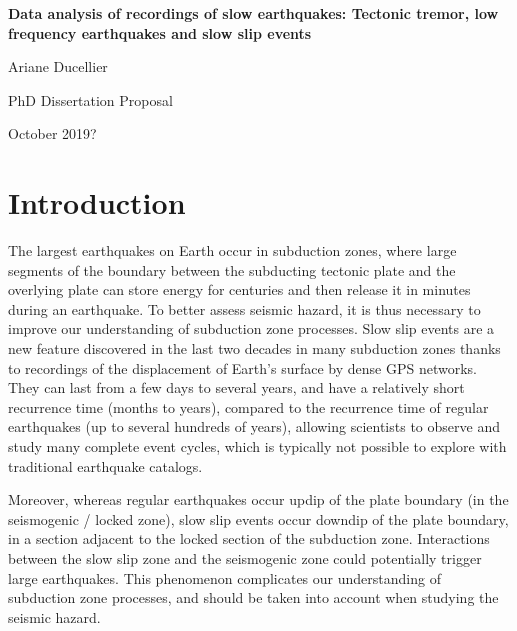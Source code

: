 \documentclass[letterpaper, 12pt]{article}
\begin{document}
\setcounter{page}{1}

\begin{center}

\textbf{Data analysis of recordings of slow earthquakes: Tectonic tremor, low frequency earthquakes and slow slip events}

\vspace{1em}

Ariane Ducellier

PhD Dissertation Proposal

October 2019?

\end{center}

\section{Introduction}

The largest earthquakes on Earth occur in subduction zones, where large segments of the boundary between the subducting tectonic plate and the overlying plate can store energy for centuries and then release it in minutes during an earthquake. To better assess seismic hazard, it is thus necessary to improve our understanding of subduction zone processes. Slow slip events are a new feature discovered in the last two decades in many subduction zones thanks to recordings of the displacement of Earth's surface by dense GPS networks. They can last from a few days to several years, and have a relatively short recurrence time (months to years), compared to the recurrence time of regular earthquakes (up to several hundreds of years), allowing scientists to observe and study many complete event cycles, which is typically not possible to explore with traditional earthquake catalogs. 

Moreover, whereas regular earthquakes occur updip of the plate boundary (in the seismogenic / locked zone), slow slip events occur downdip of the plate boundary, in a section adjacent to the locked section of the subduction zone. Interactions between the slow slip zone and the seismogenic zone could potentially trigger large earthquakes. This phenomenon complicates our understanding of subduction zone processes, and should be taken into account when studying the seismic hazard.
\end{document}
